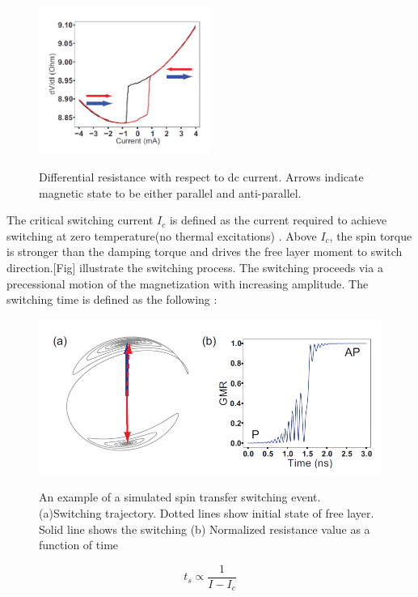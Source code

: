 \begin{figure}[h!]
\centering
\includegraphics[width=0.5\textwidth]{fig/DC.PNG}
\label{DC}
\caption{Differential resistance with respect to dc current. Arrows indicate magnetic state to be either parallel and anti-parallel.}

\end{figure}

The critical switching current $I_c$ is defined as the current required to achieve switching at zero temperature(no thermal excitations)  . Above $I_c$, the spin torque is stronger than the damping torque and drives the free layer moment to switch direction.[Fig] illustrate the switching process. The switching proceeds via a precessional motion of the magnetization with increasing amplitude\cite{subswitch}. The switching time is defined as the following :


\begin{figure}[!ht]
\centering
\includegraphics[width=1.0\textwidth]{fig/switching.PNG}
\label{Switching}
\caption{An example of a simulated spin transfer switching event.(a)Switching trajectory. Dotted lines show initial state of free layer. Solid line shows the switching (b) Normalized resistance value as a function of time}
\end{figure}

\begin{equation}
t_s \propto \frac{1}{I-I_c}
\end{equation}

